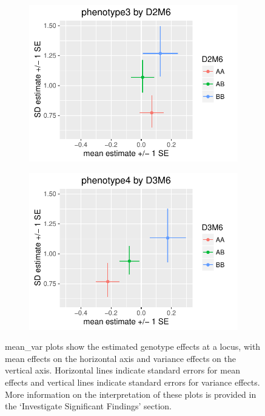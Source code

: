 \documentclass[9pt,twocolumn,twoside]{gsag3jnl}
\begin{document}
\begin{figure}[htbp]
    \begin{subfigure}[t]{0.24\textwidth}
        \includegraphics[width=\textwidth]{images/mean_var_plot_phen3.pdf}
    \end{subfigure}  
    \hfill
    \begin{subfigure}[t]{0.24\textwidth}
        \includegraphics[width=\textwidth]{images/mean_var_plot_phen4.pdf}
    \end{subfigure}
    
    \caption{mean\_var plots show the estimated genotype effects at a locus, with mean effects on the horizontal axis and variance effects on the vertical axis.  Horizontal lines indicate standard errors for mean effects and vertical lines indicate standard errors for variance effects.  More information on the interpretation of these plots is provided in the `Investigate Significant Findings' section. \label{fig:mean_var_plots}}
\end{figure}
\end{document}
